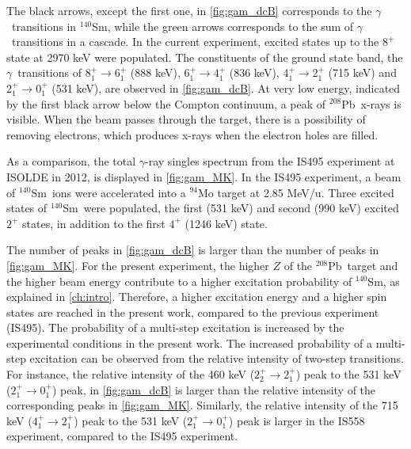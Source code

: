 \documentclass[twoside,english]{uiofysmaster/uiofysmaster}
\newcommand{\Sm}{$^{140}$Sm} %
\newcommand{\Pb}{$^{208}$Pb}
\newcommand{\ga}{$\gamma$}
\let\orgautoref\autoref
\renewcommand{\autoref}
        {%
		 \def\sectionautorefname{Section}%
		 \def\subsectionautorefname{Section}%
		 \def\subsubsectionautorefname{Section}%
		 \def\chapterautorefname{Chapter}%
          \orgautoref}
\begin{document}
The black arrows, except the first one, in \autoref{fig:gam_dcB} corresponds to the \ga\ transitions in \Sm, while the green arrows corresponds to the sum of \ga\ transitions in a cascade.
In the current experiment, excited states up to the $8^+$ state at 2970 keV were populated.
The constituents of the ground state band, the \ga\ transitions of $8_1^+ \rightarrow 6_1^+$ (888 keV), $6_1^+ \rightarrow 4_1^+$ (836 keV), $4_1^+ \rightarrow 2_1^+$ (715 keV) and $2_1^+ \rightarrow 0_1^+$ (531 keV), are observed in \autoref{fig:gam_dcB}.
At very low energy, indicated by the first black arrow below the Compton continuum, a peak of \Pb\ x-rays is visible.
When the beam passes through the target, there is a possibility of removing electrons, which produces x-rays when the electron holes are filled.

As a comparison, the total \ga-ray singles spectrum from the IS495 experiment at ISOLDE in 2012, is displayed in \autoref{fig:gam_MK}.
In the IS495 experiment, a beam of \Sm\ ions were accelerated into a $^{94}$Mo target at 2.85 MeV/u.
Three excited states of \Sm\ were populated, the first (531 keV) and second (990 keV) excited $2^+$ states, in addition to the first $4^+$ (1246 keV) state.

The number of peaks in \autoref{fig:gam_dcB} is larger than the number of peaks in \autoref{fig:gam_MK}.
For the present experiment, the higher $Z$ of the \Pb\ target and the higher beam energy contribute to a higher excitation probability of \Sm, as explained in \autoref{ch:intro}. 
Therefore, a higher excitation energy and a higher spin states are reached in the present work, compared to the previous experiment (IS495).
The probability of a multi-step excitation is increased by the experimental conditions in the present work. 
The increased probability of a multi-step excitation can be observed from the relative intensity of two-step transitions. 
For instance, the relative intensity of the 460 keV ($2_2^+ \rightarrow 2_1^+$) peak to the 531 keV ($2_1^+ \rightarrow  0_1^+$) peak, in \autoref{fig:gam_dcB} is larger than the relative intensity of the corresponding peaks in \autoref{fig:gam_MK}.
Similarly, the relative intensity of the 715 keV ($4_1^+ \rightarrow  2_1^+$) peak to the 531 keV ($2_1^+ \rightarrow  0_1^+$) peak is larger in the IS558 experiment, compared to the IS495 experiment.

\end{document}
